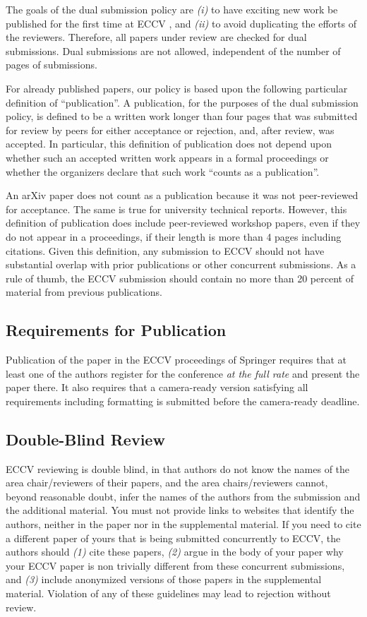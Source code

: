 \documentclass[runningheads]{llncs}
\begin{document}
The goals of the dual submission policy are \emph{(i)} to have exciting new work be published for the first time at ECCV \ECCVyear{}, and \emph{(ii)} to avoid duplicating the efforts of the reviewers.
Therefore, all papers under review are checked for dual submissions.
Dual submissions are not allowed, independent of the number of pages of submissions. 

For already published papers, our policy is based upon the following particular definition of ``publication''. 
A publication, for the purposes of the dual submission policy, is defined to be a written work longer than four pages that was submitted for review by peers for either acceptance or rejection, and, after review, was accepted. 
In particular, this definition of publication does not depend upon whether such an accepted written work appears in a formal proceedings or whether the organizers declare that such work ``counts as a publication''. 

An arXiv paper does not count as a publication because it was not peer-reviewed for acceptance. 
The same is true for university technical reports. 
However, this definition of publication does include peer-reviewed workshop papers, even if they do not appear in a proceedings, if their length is more than 4 pages including citations. 
Given this definition, any submission to ECCV \ECCVyear{} should not have substantial overlap with prior publications or other concurrent submissions. 
As a rule of thumb, the ECCV \ECCVyear{} submission should contain no more than 20 percent of material from previous publications. 


\subsection{Requirements for Publication}
Publication of the paper in the ECCV \ECCVyear{} proceedings of Springer requires that at least one of the authors register for the conference \emph{at the full rate} and present the paper there. 
It also requires that a camera-ready version satisfying all requirements including formatting is submitted before the camera-ready deadline. 


\subsection{Double-Blind Review}
\label{sec:blind}
ECCV reviewing is double blind, in that authors do not know the names of the area chair/reviewers of their papers, and the area chairs/reviewers cannot, beyond reasonable doubt, infer the names of the authors from the submission and the additional material. 
You must not provide links to websites that identify the authors, neither in the paper nor in the supplemental material.
If you need to cite a different paper of yours that is being submitted concurrently to ECCV, the authors should \emph{(1)} cite these papers, \emph{(2)} argue in the body of your paper why your ECCV paper is non trivially different from these concurrent submissions, and \emph{(3)} include anonymized versions of those papers in the supplemental material.
Violation of any of these guidelines may lead to rejection without review. 
\end{document}

